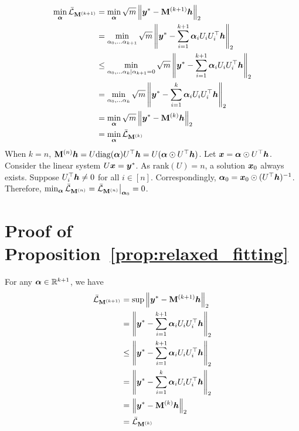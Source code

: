 \documentclass{article} %
\def\valpha{{\bm\alpha}}
\begin{document}
	\begin{equation}
		\begin{aligned}
			\min_{\valpha}\bar\gL_{\rmM^{(k+1)}}&=\min_{\valpha}\sqrt{m}\left\|\vy^*-\rmM^{(k+1)}\vh\right\|_2\\
			&=\min_{\alpha_0,\dots\alpha_{k+1}}\sqrt{m}\left\|\vy^*-\sum_{i=1}^{k+1}\valpha_iU_iU_i^{\top}\vh\right\|_2\\
			&\leq\min_{\alpha_0,\dots\alpha_k|\alpha_{k+1}=0}\sqrt{m}\left\|\vy^*-\sum_{i=1}^{k+1}\valpha_iU_iU_i^{\top}\vh\right\|_2\\
			&=\min_{\alpha_0,\dots\alpha_k}\sqrt{m}\left\|\vy^*-\sum_{i=1}^k\valpha_iU_iU_i^{\top}\vh\right\|_2\\
			&=\min_{\valpha}\sqrt{m}\left\|\vy^*-\rmM^{(k)}\vh\right\|_2\\
			&=\min_{\valpha}\bar\gL_{\rmM^{(k)}}
		\end{aligned}
	\end{equation}
	When $k=n$, $\rmM^{(n)}\vh=U\mathrm{diag}(\valpha)U^{\top}\vh=U(\valpha\odot U^{\top}\vh)$.
	Let $\vx=\valpha\odot U^{\top}\vh$.
	Consider the linear system $U{\bm{x}}={\bm{y}}^*$.
	As $\mathrm{rank}(U)=n$, a solution ${\bm{x}}_0$ always exists.
	Suppose $U_i^{\top}{\bm{h}}\neq0$ for all $i\in[n]$.
	Correspondingly, $\valpha_0=\vx_0\odot(U^{\top}\vh)^{-1}$.
	Therefore, $\min_{\valpha}\bar\gL_{\rmM^{(n)}}=\bar\gL_{\rmM^{(n)}}\big|_{\valpha_0}=0$.
	
	
	\section{Proof of Proposition~\ref{prop:relaxed_fitting}}
	\label{sec:relaxed_fitting2}
	
	For any $\valpha\in\sR^{k+1}$, we have
	\begin{equation}
		\begin{aligned}
			\bar\gL_{\rmM^{(k+1)}}&=\sup\left\|\vy^*-\rmM^{(k+1)}\vh\right\|_2\\
			&=\left\|\vy^*-\sum_{i=1}^{k+1}\valpha_iU_iU_i^{\top}\vh\right\|_2\\
			&\leq\left\|\vy^*-\sum_{i=1}^{k+1}\valpha_iU_iU_i^{\top}\vh\right\|_2\\
			&=\left\|\vy^*-\sum_{i=1}^k\valpha_iU_iU_i^{\top}\vh\right\|_2\\
			&=\left\|\vy^*-\rmM^{(k)}\vh\right\|_2\\
			&=\bar\gL_{\rmM^{(k)}}
		\end{aligned}
	\end{equation}
	
\end{document}
